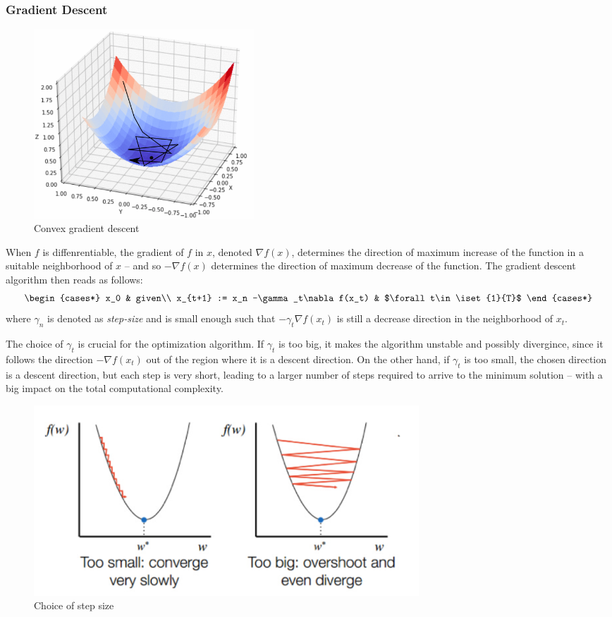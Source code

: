 \documentclass{../cs-classes/cs-classes}
\begin{document}
\subsubsection{Gradient Descent}
\begin{figure}
    \captionsetup{justification=centering}
    \includegraphics[width=0.4\textwidth]{images/gradient-descent-2.png}
    \caption{Convex gradient descent}
\end{figure}
When $f$ is diffenrentiable, the gradient of $f$ in $x$, denoted $\nabla f(x)$, determines the direction of maximum increase of the function in a suitable neighborhood of $x$ -- and so $-\nabla f(x)$ determines the direction of maximum decrease of the function. The gradient descent algorithm then reads as follows:
\begin{equation*}
    \begin{cases*}
        x_0 & given\\
        x_{t+1} := x_n -\gamma_t\nabla f(x_t) & $\forall t\in\iset{1}{T}$
    \end{cases*}
\end{equation*}
where $\gamma_n$ is denoted as \emph{step-size} and is small enough such that $-\gamma_t\nabla f(x_t)$ is still a decrease direction in the neighborhood of $x_t$.

The choice of $\gamma_t$ is crucial for the optimization algorithm. If $\gamma_t$ is too big, it makes the algorithm unstable and possibly divergince, since it follows the direction $-\nabla f(x_t)$ out of the region where it is a descent direction. On the other hand, if $\gamma_t$ is too small, the chosen direction is a descent direction, but each step is very short, leading to a larger number of steps required to arrive to the minimum solution -- with a big impact on the total computational complexity.

\begin{figure}[H]
    \centering
    \includegraphics[width=0.7\textwidth]{images/gd-step-size.png}
    \caption{Choice of step size}
\end{figure}
\end{document}
